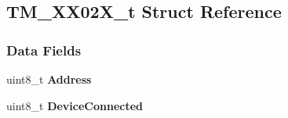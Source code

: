 \hypertarget{struct_t_m__24_x_x02_x__t}{}\subsection{T\+M\+\_\+X\+X02\+X\+\_\+t Struct Reference}
\label{struct_t_m__24_x_x02_x__t}
\subsubsection*{Data Fields}
\begin{DoxyCompactItemize}
\item 
\hypertarget{struct_t_m__24_x_x02_x__t_ae2bbeaf207df18992544fd4193b34112}{}uint8\+\_\+t {\bfseries Address}\label{struct_t_m__24_x_x02_x__t_ae2bbeaf207df18992544fd4193b34112}

\item 
\hypertarget{struct_t_m__24_x_x02_x__t_a288a8fb632eca374c60fec3dbdc901aa}{}uint8\+\_\+t {\bfseries Device\+Connected}\label{struct_t_m__24_x_x02_x__t_a288a8fb632eca374c60fec3dbdc901aa}

\end{DoxyCompactItemize}
